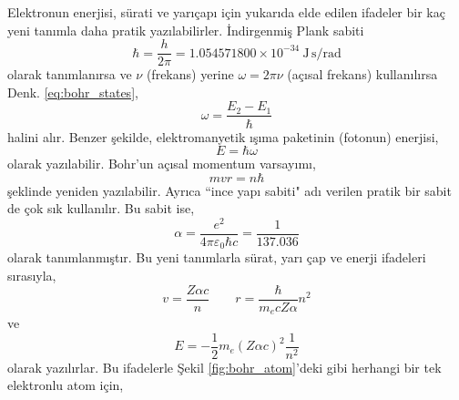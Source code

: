 \documentclass[00_kitap.tex]{subfiles}
\begin{document}
Elektronun enerjisi, sürati ve yarıçapı için yukarıda elde edilen ifadeler bir kaç yeni tanımla daha pratik yazılabilirler. İndirgenmiş Plank sabiti 
\begin{equation}
\hbar = \frac{h}{2\pi} = 1.054571800 \times 10^{-34}\ \text{J}\,\text{s}/\text{rad}
\label{eq:reduced_planck_const}
\end{equation}
olarak tanımlanırsa ve $\nu$ (frekans) yerine $\omega = 2\pi \nu$ (açısal frekans) kullanılırsa Denk. \ref{eq:bohr_states}, 
\begin{equation}
\omega = \frac{E_2 - E_1}{\hbar}
\label{eq:bohr_states_2pi}
\end{equation}
halini alır. Benzer şekilde, elektromanyetik ışıma paketinin (fotonun) enerjisi,
\begin{equation}
E = \hbar \omega
\label{eq:foton_energy_2pi}
\end{equation}
olarak yazılabilir. Bohr'un açısal momentum varsayımı,
\begin{equation}
m v r = n \hbar
\label{eq:bohr_allowed_states_2pi}
\end{equation}
şeklinde yeniden yazılabilir. Ayrıca ``ince yapı sabiti" adı verilen pratik bir sabit de çok sık kullanılır. Bu sabit ise,
\begin{equation}
\alpha = \frac{e^2}{4\pi\varepsilon_0\hbar c} =\frac{1}{137.036}
\label{eq:fine_structure_const}
\end{equation}
olarak tanımlanmıştır. Bu yeni tanımlarla sürat, yarı çap ve enerji ifadeleri sırasıyla,
\begin{equation}
v = \frac{Z \alpha c}{n} \hspace{24pt} r = \frac{\hbar}{m_e c Z \alpha} n^2
\label{eq:bohr_v_r_2pi}
\end{equation}
ve
\begin{equation}
E = -\frac{1}{2}m_e (Z \alpha c)^2 \frac{1}{n^2}
\label{eq:bohr_E_2pi}
\end{equation}
olarak yazılırlar. Bu ifadelerle Şekil \ref{fig:bohr_atom}'deki gibi herhangi bir tek elektronlu atom için,
\end{document}
